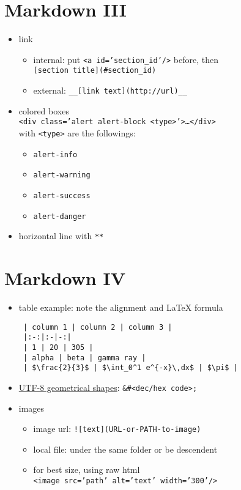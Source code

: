 \documentclass[11pt]{extarticle}
\begin{document}
\newpage

\section*{Markdown III}

\begin{itemize}
  \item link 
    \begin{itemize}
      \item internal: put {\tt <a id='section\_id'/>} before, then \\
        {\tt [section title](\#section\_id)}
      \item external: {\tt \_\_[link text](http://url)\_\_}
    \end{itemize}
  \item colored boxes \\{\tt <div class='alert alert-block <type>'>\dots</div>} \\
    with {\tt <type>} are the followings: 
    \begin{itemize}
      \item {\tt alert-info}
      \item {\tt alert-warning}
      \item {\tt alert-success}
      \item {\tt alert-danger}
    \end{itemize}
  \item horizontal line with {\tt ***}
\end{itemize}

\section*{Markdown IV}

\begin{itemize}
  \item table example: note the alignment and \LaTeX{} formula
    \begin{verbatim}
 | column 1 | column 2 | column 3 |
 |:-:|:-|-:|
 | 1 | 20 | 305 |
 | alpha | beta | gamma ray |
 | $\frac{2}{3}$ | $\int_0^1 e^{-x}\,dx$ | $\pi$ |
    \end{verbatim}
  \item \href{https://www.w3schools.com/charsets/ref_utf_geometric.asp}{UTF-8 geometrical shapes}: {\tt \&\#<dec/hex code>;}  
  \item images
    \begin{itemize}
      \item image url: {\tt ![text](URL-or-PATH-to-image)}
      \item local file: under the same folder or be descendent
      \item for best size, using raw html \\
        {\tt<image src='path' alt='text' width='300'/>}
    \end{itemize}
\end{itemize}
\newpage

%
%
\end{document}
